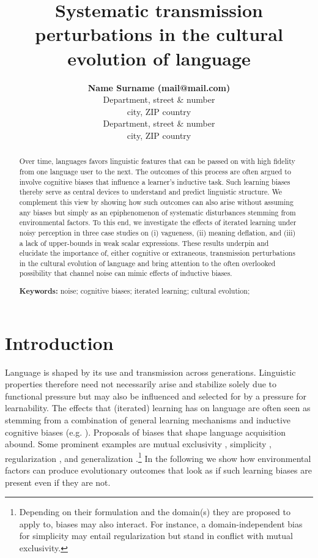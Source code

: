 \documentclass[10pt,a4paper]{article}
\title{Systematic transmission perturbations in the cultural evolution of language}
\author{{\large \bf Name Surname (mail@mail.com)} \\
  Department, street \& number \\
  city, ZIP country
  \AND {\large \bf Name Surname (mail@mail.com)} \\
  Department, street \& number \\
  city, ZIP country}
\begin{document}
\maketitle

\begin{abstract}
Over time, languages favors linguistic features that can be passed on with high fidelity from one language user to the next. The outcomes of this process are often argued to involve cognitive biases that influence a learner's inductive task. Such learning biases thereby serve as central devices to understand and predict linguistic structure. We complement this view by showing how such outcomes can also arise without assuming any biases but simply as an epiphenomenon of systematic disturbances stemming from environmental factors. To this end, we investigate the effects of iterated learning under noisy perception in three case studies on (i) vagueness, (ii) meaning deflation, and (iii) a lack of upper-bounds in weak scalar expressions. These results underpin and elucidate the importance of, either cognitive or extraneous, transmission perturbations in the cultural evolution of language and bring attention to the often overlooked possibility that channel noise can mimic effects of inductive biases.

\textbf{Keywords:} 
noise; cognitive biases; iterated learning; cultural evolution;  
\end{abstract}
\section{Introduction}
Language is shaped by its use and transmission across generations. Linguistic properties therefore need not necessarily arise and stabilize solely due to functional pressure but may also be influenced and selected for by a pressure for learnability. The effects that (iterated) learning has on language are often seen as stemming from a combination of general learning mechanisms and inductive cognitive biases (e.g. \citealt{griffiths+kalish:2007,kirby+etal:2014,tamariz+kirby:2016}). Proposals of biases that shape language acquisition abound. Some prominent examples are mutual exclusivity \citep{merriman+bowman:1989,clark:2009}, simplicity \citep{kirby+etal:2015}, regularization \citep{hudson+etal:2005}, and generalization \citep{smith:2011,oconnor:2015}.\footnote{Depending on their formulation and the domain(s) they are proposed to apply to, biases may also interact. For instance, a domain-independent bias for simplicity may entail regularization but stand in conflict with mutual exclusivity.} In the following we show how environmental factors can produce evolutionary outcomes that look as if such learning biases are present even if they are not.
\end{document}
